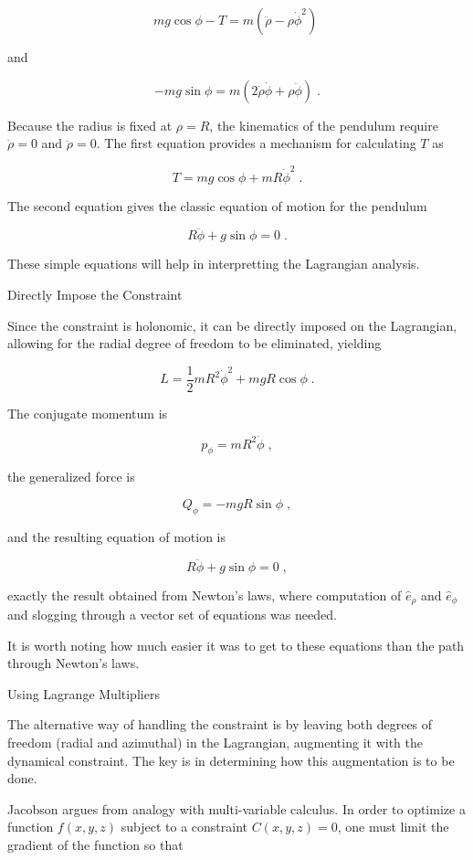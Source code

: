 \documentclass[12pt]{article}
\begin{document}
\[ m g \cos \phi - T = m (\ddot \rho - \rho \dot \phi^2 ) \; \]

and

\[ -m g \sin \phi = m ( 2 \dot \rho \dot \phi + \rho \ddot \phi )\; .\]

Because the radius is fixed at $\rho = R$, the kinematics of the pendulum require $\dot \rho = 0$ and $\ddot \rho = 0$.  The first equation provides a mechanism for calculating $T$ as

\[ T = m g \cos \phi + m R \dot \phi^2 \; .\]

The second equation gives the classic equation of motion for the pendulum

\[ R \ddot \phi + g \sin \phi = 0 \; .\]

These simple equations will help in interpretting the Lagrangian analysis.  

Directly Impose the Constraint

Since the constraint is holonomic, it can be directly imposed on the Lagrangian, allowing for the radial degree of freedom to be eliminated, yielding

\[ L = \frac{1}{2} m R^2 \dot \phi^2 + m g R \cos \phi \; . \]

The conjugate momentum is 

\[ p_{\phi} = m R^2 \dot \phi \; , \]

the generalized force is 

\[ Q_{\phi} =  - m g R \sin \phi \; , \]

and the resulting equation of motion is 

\[ R \ddot \phi + g \sin \phi = 0 \; , \]

exactly the result obtained from Newton's laws, where computation of $\hat e_{\rho}$ and $\hat e_{\phi}$ and slogging through a vector set of equations was needed.
  
It is worth noting how much easier it was to get to these equations than the path through Newton's laws.  

Using Lagrange Multipliers

The alternative way of handling the constraint is by leaving both degrees of freedom (radial and azimuthal) in the Lagrangian, augmenting it with the dynamical constraint.  The key is in determining how this augmentation is to be done.  

Jacobson argues from analogy with multi-variable calculus.  In order to optimize a function $f(x,y,z)$ subject to a constraint $C(x,y,z) = 0$, one must limit the gradient of the function so that 
\end{document}
